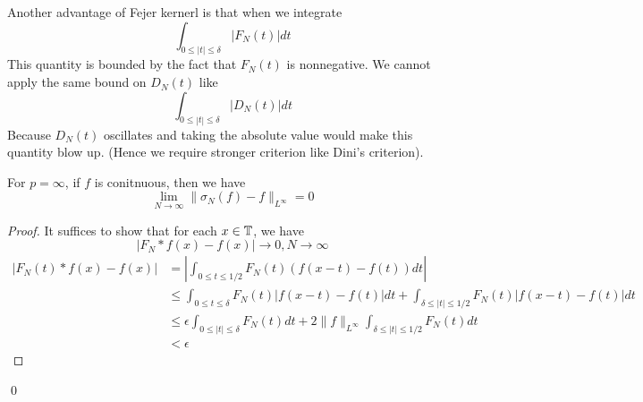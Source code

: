 \begin{remark}
    Another advantage of Fejer kernerl is that when we integrate 
    \begin{equation*}
        \int_{0\leq|t|\leq\delta}|F_N(t)|dt
    \end{equation*}
    This quantity is bounded by the fact that $F_N(t)$ is nonnegative. We cannot apply the same bound on $D_N(t)$ like
    \begin{equation*}
        \int_{0\leq |t|\leq\delta}|D_N(t)|dt
    \end{equation*}
    Because $D_N(t)$ oscillates and taking the absolute value would make this quantity blow up. (Hence we require stronger criterion like Dini's criterion).
\end{remark}

\begin{theorem}[The $p=\infty$ case]
    For $p=\infty$, if $f$ is conitnuous, then we have
    \begin{equation*}
        \lim_{N\to\infty}\|\sigma_N(f)-f\|_{L^\infty}=0
    \end{equation*}
\end{theorem}
\begin{proof}
    It suffices to show that for each $x\in\mathbb{T}$, we have
    \begin{equation*}
        |F_N\ast f(x)-f(x)|\to 0, N\to\infty
    \end{equation*}
    \begin{align*}
        |F_N(t)\ast f(x)-f(x)|&=\left|\int_{0\leq t\leq 1/2}F_N(t)(f(x-t)-f(t))dt \right|\\
        &\leq \int_{0\leq t\leq\delta}F_N(t)|f(x-t)-f(t)|dt +\int_{\delta\leq|t|\leq 1/2}F_N(t)|f(x-t)-f(t)|dt\\
        &\leq\epsilon\int_{0\leq |t|\leq\delta}F_N(t)dt+2\|f\|_{L^\infty}\int_{\delta\leq|t|\leq 1/2}F_N(t)dt\\
        &<\epsilon
    \end{align*}
\end{proof}
\qed

